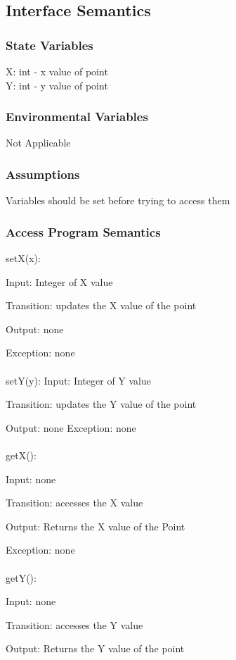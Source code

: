 \documentclass[12,english]{article}
\begin{document}
		\subsection{Interface Semantics}
			\subsubsection{State Variables}
			X: int - x value of point\\
			Y: int - y value of point
			
			\subsubsection{Environmental Variables}
			Not Applicable
			
			\subsubsection{Assumptions}
			Variables should be set before trying to access them
			
			\subsubsection{Access Program Semantics}
			setX(x):
			
			Input: Integer of X value
			
			Transition: updates the X value of the point
			
			Output: none
			
			Exception: none\\
			\\
			setY(y):
			Input: Integer of Y value
			
			Transition: updates the Y value of the point
			
			Output: none
			Exception: none\\
			\\
			getX():
			
			Input: none
			
			Transition: accesses the X value
			
			Output: Returns the X value of the Point
			
			Exception: none\\
			\\
			getY():
			
			Input: none
			
			Transition: accesses the Y value
			
			Output: Returns the Y value of the point
			
\end{document}
